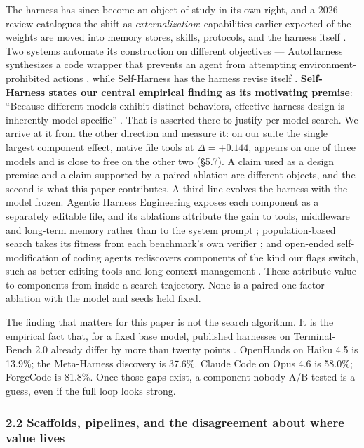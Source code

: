 \documentclass[
  10pt,
  a4paper,
]{article}
\begin{document}
The harness has since become an object of study in its own right, and a
2026 review catalogues the shift as \emph{externalization}: capabilities
earlier expected of the weights are moved into memory stores, skills,
protocols, and the harness itself \citep{zhou2026externalization}. Two
systems automate its construction on different objectives ---
AutoHarness synthesizes a code wrapper that prevents an agent from
attempting environment-prohibited actions \citep{lou2026autoharness},
while Self-Harness has the harness revise itself
\citep{zhang2026selfharness}. \textbf{Self-Harness states our central
empirical finding as its motivating premise}: ``Because different models
exhibit distinct behaviors, effective harness design is inherently
model-specific'' \citep{zhang2026selfharness}. That is asserted there to
justify per-model search. We arrive at it from the other direction and
measure it: on our suite the single largest component effect, native
file tools at \(\Delta = +0.144\), appears on one of three models and is
close to free on the other two (§5.7). A claim used as a design premise
and a claim supported by a paired ablation are different objects, and
the second is what this paper contributes. A third line evolves the
harness with the model frozen. Agentic Harness Engineering exposes each
component as a separately editable file, and its ablations attribute the
gain to tools, middleware and long-term memory rather than to the system
prompt \citep{lin2026ahe}; population-based search takes its fitness
from each benchmark's own verifier \citep{zhang2026darwinx}; and
open-ended self-modification of coding agents rediscovers components of
the kind our flags switch, such as better editing tools and long-context
management \citep{zhang2025dgm}. These attribute value to components
from inside a search trajectory. None is a paired one-factor ablation
with the model and seeds held fixed.

The finding that matters for this paper is not the search algorithm. It
is the empirical fact that, for a fixed base model, published harnesses
on Terminal-Bench 2.0 already differ by more than twenty points
\citep[Table 7]{lee2026metaharness}. OpenHands on Haiku 4.5 is 13.9\%;
the Meta-Harness discovery is 37.6\%. Claude Code on Opus 4.6 is 58.0\%;
ForgeCode is 81.8\%. Once those gaps exist, a component nobody
A/B-tested is a guess, even if the full loop looks strong.

\subsubsection{2.2 Scaffolds, pipelines, and the disagreement about
where value
lives}\label{scaffolds-pipelines-and-the-disagreement-about-where-value-lives}
\end{document}
